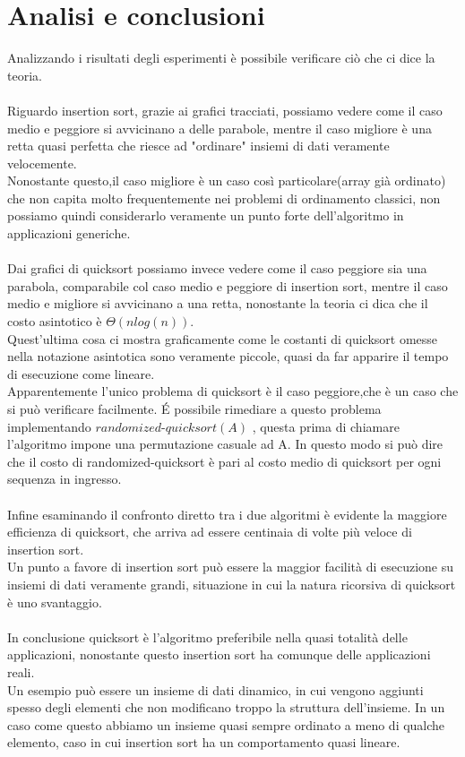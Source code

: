 \documentclass[]{article}
\begin{document}
\section{Analisi e conclusioni}
Analizzando i risultati degli esperimenti è possibile verificare ciò che ci dice la teoria.\\\\
Riguardo insertion sort, grazie ai grafici tracciati, possiamo vedere come il caso medio e peggiore si avvicinano a delle parabole, mentre il caso migliore è una retta quasi perfetta che riesce ad "ordinare" insiemi di dati veramente velocemente.\\
Nonostante questo,il caso migliore è un caso così particolare(array già ordinato) che non capita molto frequentemente nei problemi di ordinamento classici, non possiamo quindi considerarlo veramente un punto forte dell'algoritmo in applicazioni generiche.\\\\
Dai grafici di quicksort possiamo invece vedere come il caso peggiore sia una parabola, comparabile col caso medio e peggiore di insertion sort, mentre il caso medio e migliore si avvicinano a una retta, nonostante la teoria ci dica che il costo asintotico è $\Theta(nlog(n))$.\\
Quest'ultima cosa ci mostra graficamente come le costanti di quicksort omesse nella notazione asintotica sono veramente piccole, quasi da far apparire il tempo di esecuzione come lineare.\\
Apparentemente l'unico problema di quicksort è il caso peggiore,che è un caso che si può verificare facilmente. \'E possibile rimediare a questo problema implementando $randomized\mbox{-}quicksort(A)$ , questa prima di chiamare l'algoritmo impone una permutazione casuale ad A. In questo modo si può dire che il costo di randomized-quicksort è pari al costo medio di quicksort per ogni sequenza in ingresso.\\\\
Infine esaminando il confronto diretto tra i due algoritmi è evidente la maggiore efficienza di quicksort, che arriva ad essere centinaia di volte più veloce di insertion sort.\\
Un punto a favore di insertion sort può essere la maggior facilità di esecuzione su insiemi di dati veramente grandi, situazione in cui la natura ricorsiva di quicksort è uno svantaggio.\\\\
In conclusione quicksort è l'algoritmo preferibile nella quasi totalità delle applicazioni, nonostante questo insertion sort ha comunque delle applicazioni reali.\\
Un esempio può essere un insieme di dati dinamico, in cui vengono aggiunti spesso degli elementi che non modificano troppo la struttura dell'insieme. In un caso come questo abbiamo un insieme quasi sempre ordinato a meno di qualche elemento, caso in cui insertion sort ha un comportamento quasi lineare.
\end{document}
